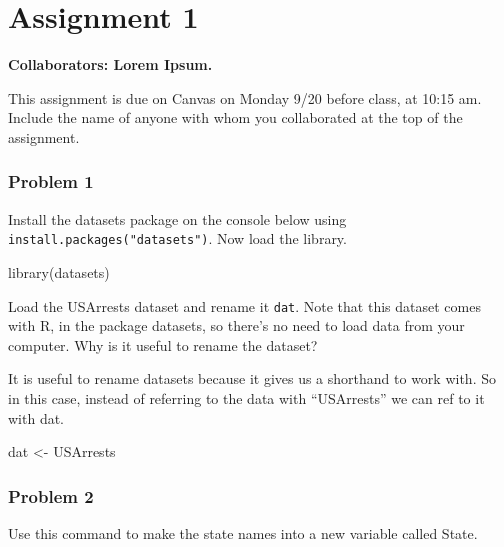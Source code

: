 \documentclass[
]{article}
\newenvironment{Shaded}{\begin{snugshade}}{\end{snugshade}}
\newcommand{\FunctionTok}[1]{\textcolor[rgb]{0.00,0.00,0.00}{#1}}
\newcommand{\NormalTok}[1]{#1}
\newcommand{\OtherTok}[1]{\textcolor[rgb]{0.56,0.35,0.01}{#1}}
\newcommand{\SpecialCharTok}[1]{\textcolor[rgb]{0.00,0.00,0.00}{#1}}
\begin{document}
\hypertarget{assignment-1}{%
\section{Assignment 1}\label{assignment-1}}

\textbf{Collaborators: Lorem Ipsum. }

This assignment is due on Canvas on Monday 9/20 before class, at 10:15
am. Include the name of anyone with whom you collaborated at the top of
the assignment.

\hypertarget{problem-1}{%
\subsubsection{Problem 1}\label{problem-1}}

Install the datasets package on the console below using
\texttt{install.packages("datasets")}. Now load the library.

\begin{Shaded}
\begin{Highlighting}[]
\FunctionTok{library}\NormalTok{(datasets)}
\end{Highlighting}
\end{Shaded}

Load the USArrests dataset and rename it \texttt{dat}. Note that this
dataset comes with R, in the package datasets, so there's no need to
load data from your computer. Why is it useful to rename the dataset?

It is useful to rename datasets because it gives us a shorthand to work
with. So in this case, instead of referring to the data with
``USArrests'' we can ref to it with dat.

\begin{Shaded}
\begin{Highlighting}[]
\NormalTok{dat }\OtherTok{\textless{}{-}}\NormalTok{ USArrests}
\end{Highlighting}
\end{Shaded}

\hypertarget{problem-2}{%
\subsubsection{Problem 2}\label{problem-2}}

Use this command to make the state names into a new variable called
State.

\begin{Shaded}
\end{Shaded}
\end{document}
